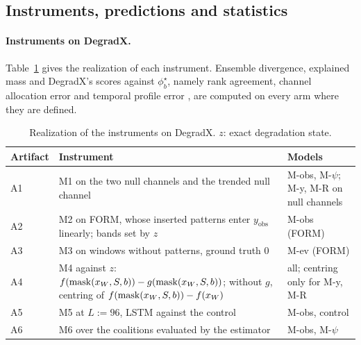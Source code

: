 \documentclass{article}
\begin{document}
\subsection{Instruments, predictions and statistics}\label{sec:eval:instruments}

\paragraph{Instruments on DegradX.} Table~\ref{tab:instruments} gives the realization of each instrument. Ensemble divergence, explained mass and DegradX's scores against $\phi^\star_b$, namely rank agreement, channel allocation error and temporal profile error \citep{degradx2026}, are computed on every arm where they are defined.

\begin{table}[t]
\caption{Realization of the instruments on DegradX. $z$: exact degradation state.}
\label{tab:instruments}
\centering
\small
\begin{tabularx}{\linewidth}{@{}l>{\raggedright\arraybackslash}X>{\raggedright\arraybackslash}p{2.7cm}@{}}
\toprule
Artifact & Instrument & Models \\
\midrule
A1 & M1 on the two null channels and the trended null channel & M-obs, M-$\psi$; M-y, M-R on null channels \\
A2 & M2 on FORM, whose inserted patterns enter $y_{\mathrm{obs}}$ linearly; bands set by $z$ & M-obs (FORM) \\
A3 & M3 on windows without patterns, ground truth 0 & M-ev (FORM) \\
A4 & M4 against $z$: $f(\operatorname{mask}(x_W,S,b))-g(\operatorname{mask}(x_W,S,b))$; without $g$, centring of $f(\operatorname{mask}(x_W,S,b))-f(x_W)$ & all; centring only for M-y, M-R \\
A5 & M5 at $L:=96$, LSTM against the control & M-obs, control \\
A6 & M6 over the coalitions evaluated by the estimator & M-obs, M-$\psi$ \\
\bottomrule
\end{tabularx}
\end{table}
\end{document}
